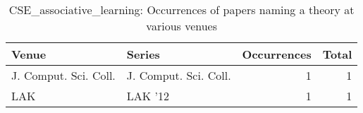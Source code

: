 \begin{table*}[t]
\begin{tabular}{llrr}
Venue & Series & Occurrences & Total\\\hline
\multirow{1}{*}{J. Comput. Sci. Coll.} & J. Comput. Sci. Coll. & 1 & \multirow{1}{*}{1}\\
\multirow{1}{*}{LAK } & LAK '12 & 1 & \multirow{1}{*}{1}\\
\end{tabular}
\caption{CSE\_associative\_learning: Occurrences of papers naming a theory at various venues}
\end{table*}